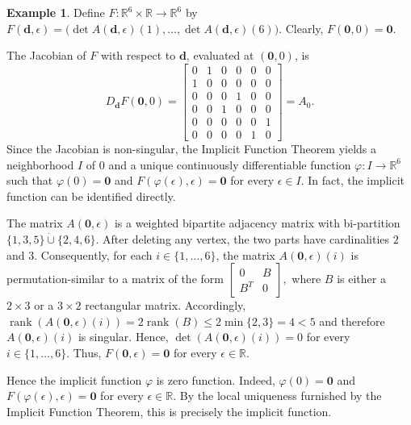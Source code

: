 \documentclass[12pt,reqno]{amsart}
\theoremstyle{plain}
\theoremstyle{definition}
\newtheorem{example}{Example}
\theoremstyle{block}
\theoremstyle{remark}
\numberwithin{equation}{section}
\begin{document}
\begin{example}
Define
\(
F:\mathbb R^6\times\mathbb R\longrightarrow\mathbb R^6
\)
by
\(
F(\mathbf d,\epsilon)
=
\bigl(
\det A(\mathbf d,\epsilon)(1),\ldots,
\det A(\mathbf d,\epsilon)(6)
\bigr).
\)
Clearly,
\(
F(\mathbf 0,0)=\mathbf 0.
\)

The Jacobian of \(F\) with respect to \(\mathbf d\), evaluated at
\((\mathbf 0,0)\), is
\[
D_{\mathbf d}F(\mathbf 0,0)
=
\begin{bmatrix}
0&1&0&0&0&0\\
1&0&0&0&0&0\\
0&0&0&1&0&0\\
0&0&1&0&0&0\\
0&0&0&0&0&1\\
0&0&0&0&1&0
\end{bmatrix}
=A_0.
\]
Since the Jacobian is non-singular, the Implicit Function Theorem yields a
neighborhood \(I\) of \(0\) and a unique continuously differentiable
function
\(
\varphi:I\longrightarrow\mathbb R^6
\)
such that
\(
\varphi(0)=\mathbf 0
\)
and
\(
F(\varphi(\epsilon),\epsilon)=\mathbf 0
\)
for every \(\epsilon\in I\).
In fact, the implicit function can be identified directly. 

The matrix
\(A(\mathbf 0,\epsilon)\) is a weighted bipartite adjacency matrix with
bi-partition
\(
\{1,3,5\}\mathbin{\dot\cup}\{2,4,6\}.
\)
After deleting any vertex, the two parts have cardinalities \(2\) and
\(3\). Consequently, for each \(i\in\{1,\ldots,6\}\), the matrix
\(A(\mathbf 0,\epsilon)(i)\) is permutation-similar to a matrix of the
form
\(
\begin{bmatrix}
0&B\\
B^T&0
\end{bmatrix},
\)
where \(B\) is either a \(2\times 3\) or a \(3\times2\) rectangular matrix. Accordingly,
\(
\operatorname{rank}\!\left(A(\mathbf 0,\epsilon)(i)\right)
=
2\operatorname{rank}(B)
\leq
2\min\{2,3\}
=
4
<
5
\)
and therefore \(A(\mathbf 0,\epsilon)(i)\) is singular. Hence,
\(
\det\!\left(A(\mathbf 0,\epsilon)(i)\right)=0
\)
for every \(i\in\{1,\ldots,6\}\). Thus,
\(
F(\mathbf 0,\epsilon)=\mathbf 0
\)
for every \(\epsilon\in\mathbb R\).

Hence the implicit function \(\varphi\) is zero function. Indeed,
\(
\varphi(0)=\mathbf 0
\)
and
\(
F(\varphi(\epsilon),\epsilon)=\mathbf 0
\)
for every \(\epsilon\in\mathbb R\). By the local uniqueness furnished by
the Implicit Function Theorem, this is precisely the implicit function.


\end{example}
\end{document}
